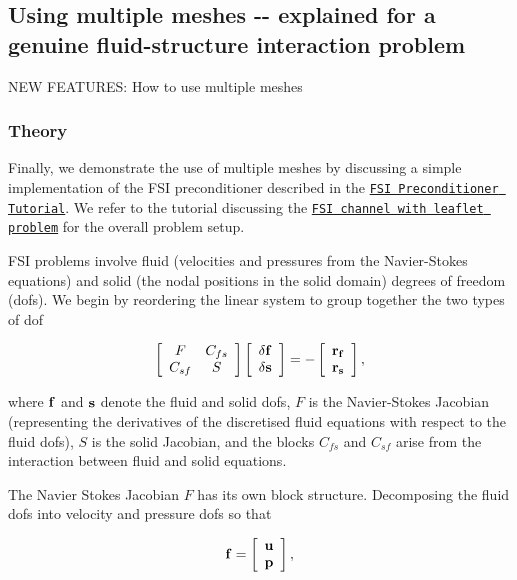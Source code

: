 \hypertarget{index_fsi_multiple_meshes}{}\subsection{Using multiple meshes -\/-\/ explained for a genuine fluid-\/structure interaction problem}\label{index_fsi_multiple_meshes}
N\+EW F\+E\+A\+T\+U\+R\+ES\+: How to use multiple meshes\hypertarget{index_fsi_multiple_meshes_theory}{}\subsubsection{Theory}\label{index_fsi_multiple_meshes_theory}
Finally, we demonstrate the use of multiple meshes by discussing a simple implementation of the F\+SI preconditioner described in the \href{../../../preconditioners/fsi/html/index.html}{\tt F\+SI Preconditioner Tutorial}. We refer to the tutorial discussing the \href{../../../interaction/fsi_channel_with_leaflet/html/index.html}{\tt F\+SI channel with leaflet problem} for the overall problem setup.

F\+SI problems involve fluid (velocities and pressures from the Navier-\/\+Stokes equations) and solid (the nodal positions in the solid domain) degrees of freedom (dofs). We begin by reordering the linear system to group together the two types of dof

\[ \left[ \begin{array}{cc} F&C_{fs}\\ C_{sf}&S \end{array} \right] \left[ \begin{array}{c} \bf \delta f\\ \bf \delta s \end{array} \right] = - \left[ \begin{array}{c} \bf r_f\\ \bf r_s \end{array} \right] , \]

where $\bf f$ and $\bf s$ denote the fluid and solid dofs, $F$ is the Navier-\/\+Stokes Jacobian (representing the derivatives of the discretised fluid equations with respect to the fluid dofs), $S$ is the solid Jacobian, and the blocks $C_{fs}$ and $C_{sf}$ arise from the interaction between fluid and solid equations.

The Navier Stokes Jacobian $F$ has its own block structure. Decomposing the fluid dofs into velocity and pressure dofs so that

\[ {\bf f}= \left[ \begin{array}{c} \bf u\\ \bf p \end{array} \right], \]

